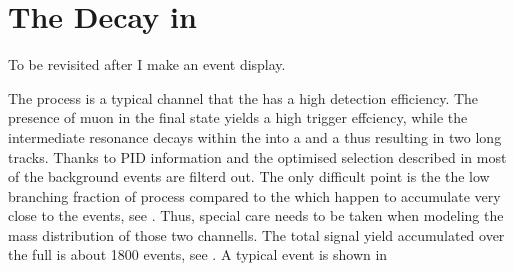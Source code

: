 \section{The \BJpsiKst Decay in \lhcb}
\label{BspsiKst_at_lhcb}
{\color{red} To be revisited after I make an event display.}

The \BsJpsiKst process is a typical channel that the \lhcb has a high detection efficiency.
The presence of muon in the final state yields a high trigger effciency, while the intermediate
\Kstar resonance decays within the \velo into a \kaon and a \pion thus resulting in two long tracks.
Thanks to PID information and the optimised selection described in \secref{} most of the background
events are filterd out. The only difficult point is the the low branching fraction of \BsJpsiKst process
compared to the \BdJpsiKst which happen to accumulate very close to the \BsJpsiKst events, see \secref{}.
Thus, special care needs to be taken when modeling the mass distribution of those two channells.
The total \BsJpsiKst signal yield accumulated over the full \runone is about 1800 events, see \equref{}.
A typical \BsJpsiKst event is  shown in \figref{}



